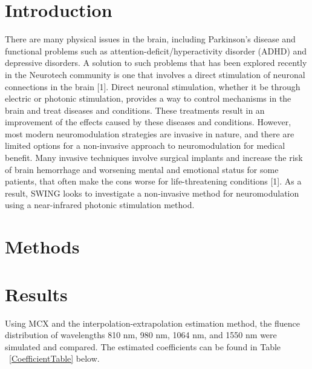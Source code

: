 \documentclass[journal,twoside,web]{ieeecolor}
\begin{document}
\section{Introduction}
\label{sec:introduction}
There are many physical issues in the brain, including Parkinson's disease and functional problems such as attention-deficit/hyperactivity disorder (ADHD)  
and depressive disorders. A solution to such problems that has been explored recently in the Neurotech community is one that involves a direct stimulation of  
neuronal connections in the brain [1]. Direct neuronal stimulation, whether it be through electric or photonic stimulation, provides a way to control  
mechanisms in the brain and treat diseases and conditions. These treatments result in an improvement of the effects caused by these diseases and conditions.  
However, most modern neuromodulation strategies are invasive in nature, and there are limited options for a non-invasive approach to neuromodulation for medical benefit.  
Many invasive techniques involve surgical implants and increase the risk of brain hemorrhage and worsening mental and emotional status for some patients,  
that often make the cons worse for life-threatening conditions [1]. As a result, SWING looks to investigate a non-invasive method for neuromodulation  
using a near-infrared photonic stimulation method. 

\section{Methods}
\label{sec:methods}

\section{Results}
\label{sec:results}

Using MCX and the interpolation-extrapolation estimation method, the fluence distribution of wavelengths 810 nm, 980 nm, 1064 nm, and 1550 nm were simulated and compared. 
The estimated coefficients can be found in Table ~\ref{CoefficientTable} below.
\end{document}
